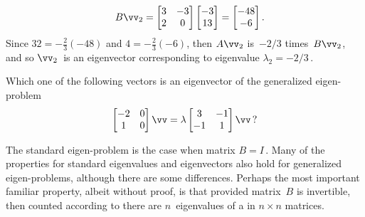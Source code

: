 \begin{example}
\begin{solution}
\begin{itemize}
\begin{align*}
&&B\vv_2=\begin{bmatrix} 3&-3\\2&0 \end{bmatrix}\begin{bmatrix} -3\\13 \end{bmatrix}
=\begin{bmatrix} -48\\-6 \end{bmatrix}.
\end{align*}
Since \(32=-\tfrac23(-48)\) and \(4=-\tfrac23(-6)\), then \(A\vv_2\) is~\(-2/3\) times~\(B\vv_2\), and so \(\vv_2\)~is an eigenvector corresponding to eigenvalue \(\lambda_2=-2/3\)\,.
\aqed

\end{itemize}
\end{solution}
\end{example}


\begin{activity}
Which one of the following vectors is an eigenvector of the generalized eigen-problem
\begin{equation*}
\begin{bmatrix} -2&0\\1&0 \end{bmatrix}\vv=\lambda\begin{bmatrix} 3&-1\\-1&1 \end{bmatrix}\vv\,?
\end{equation*}
\end{activity}


The standard eigen-problem is the case when matrix \(B=I\)\,.
Many of the properties for standard eigenvalues and eigenvectors also hold for generalized eigen-problems, although there are some differences.
Perhaps the most important familiar property, albeit without proof, is that provided matrix~\(B\) is invertible, then counted according to  there are \(n\)~eigenvalues of a  in \(n\times n\) matrices.


